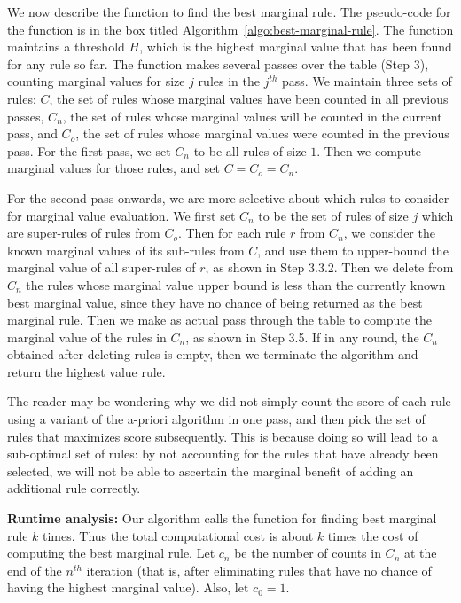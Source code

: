 \documentclass[10pt,journal,compsoc]{IEEEtran}
\newcommand{\eat}[1]{}
\newcommand{\papertext}[1]{#1}
\begin{document}
We now describe the function to find the best marginal rule. \eat{The pesudo-code for the function is in the technical report}\papertext{The pseudo-code for the function is in the box titled Algorithm~\ref{algo:best-marginal-rule}}. The function maintains a threshold $H$, which is the highest marginal value that has been found for any rule so far. The function makes several passes over the table \papertext{(Step $3$)}, counting marginal values for size $j$ rules in the $j^{th}$ pass. We maintain three sets of rules: $C$, the set of rules whose marginal values have been counted in all previous passes, $C_n$, the set of rules whose marginal values will be counted in the current pass, and $C_o$, the set of rules whose marginal values were counted in the previous pass. For the first pass, we set $C_n$ to be all rules of size $1$. Then we compute marginal values for those rules, and set $C = C_o = C_n$.

For the second pass onwards, we are more selective about which rules to consider for marginal value evaluation. We first set $C_n$ to be the set of rules of size $j$ which are super-rules of rules from $C_o$. Then for each rule $r$ from $C_n$, we consider the known marginal values of its sub-rules from $C$, and use them to upper-bound the marginal value of all super-rules of $r$, as shown in Step 3.3.2. Then we delete from $C_n$ the rules whose marginal value upper bound is less than the currently known best marginal value, since they have no chance of being returned as the best marginal rule. Then we make as actual pass through the table to compute the marginal value of the rules in $C_n$, as shown in Step 3.5. If in any round, the $C_n$ obtained after deleting rules is empty, then we terminate the algorithm and return the highest value rule. 

The reader may be wondering why we did not simply count the score of each rule using a variant of the a-priori algorithm in one pass, and then pick the set of rules that maximizes score subsequently. This is because doing so will lead to a sub-optimal set of rules: by not accounting for the rules that have already been selected, we will not be able to ascertain the marginal benefit of adding an additional rule correctly.

\noindent
\textbf{Runtime analysis:}
Our algorithm calls the function for finding best marginal rule $k$ times. Thus the total computational cost is about $k$ times the cost of computing the best marginal rule. Let $c_n$ be the number of counts in $C_n$ at the end of the $n^{th}$ iteration (that is, after eliminating rules that have no chance of having the highest marginal value). Also, let $c_0 = 1$.
\end{document}
